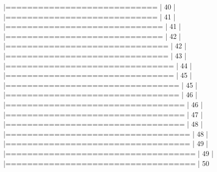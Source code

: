 \documentclass{article}
\begin{document}
\begin{Schunk}
\begin{Soutput}
  |============================                                          |  40%
  |                                                                            
  |============================                                          |  41%
  |                                                                            
  |=============================                                         |  41%
  |                                                                            
  |=============================                                         |  42%
  |                                                                            
  |==============================                                        |  42%
  |                                                                            
  |==============================                                        |  43%
  |                                                                            
  |===============================                                       |  44%
  |                                                                            
  |===============================                                       |  45%
  |                                                                            
  |================================                                      |  45%
  |                                                                            
  |================================                                      |  46%
  |                                                                            
  |=================================                                     |  46%
  |                                                                            
  |=================================                                     |  47%
  |                                                                            
  |=================================                                     |  48%
  |                                                                            
  |==================================                                    |  48%
  |                                                                            
  |==================================                                    |  49%
  |                                                                            
  |===================================                                   |  49%
  |                                                                            
  |===================================                                   |  50%

\end{Soutput}
\end{Schunk}
\end{document}
